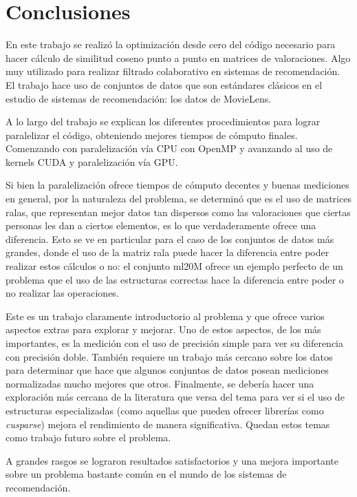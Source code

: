\documentclass[11pt, a4paper]{article}
\begin{document}
  \section{Conclusiones}\label{sec:conclusiones}

  En este trabajo se realizó la optimización desde cero del código necesario
  para hacer cálculo de similitud coseno punto a punto en matrices de
  valoraciones. Algo muy utilizado para realizar filtrado colaborativo en
  sistemas de recomendación.  El trabajo hace uso de conjuntos de datos que son
  estándares clásicos en el estudio de sistemas de recomendación: los datos de
  MovieLens.

  A lo largo del trabajo se explican los diferentes procedimientos para lograr
  paralelizar el código, obteniendo mejores tiempos de cómputo finales.
  Comenzando con paralelización vía CPU con OpenMP y avanzando al uso de
  kernels CUDA y paralelización vía GPU.

  Si bien la paralelización ofrece tiempos de cómputo decentes y buenas
  mediciones en general, por la naturaleza del problema, se determinó que es el
  uso de matrices ralas, que representan mejor datos tan dispersos como las
  valoraciones que ciertas personas les dan a ciertos elementos, es lo que
  verdaderamente ofrece una diferencia. Esto se ve en particular para el caso
  de los conjuntos de datos más grandes, donde el uso de la matriz rala puede
  hacer la diferencia entre poder realizar estos cálculos o no: el conjunto
  ml20M ofrece un ejemplo perfecto de un problema que el uso de las estructuras
  correctas hace la diferencia entre poder o no realizar las operaciones.

  Este es un trabajo claramente introductorio al problema y que ofrece varios
  aspectos extras para explorar y mejorar. Uno de estos aspectos, de los más
  importantes, es la medición con el uso de precisión simple para ver su
  diferencia con precisión doble. También requiere un trabajo más cercano sobre
  los datos para determinar que hace que algunos conjuntos de datos posean
  mediciones normalizadas mucho mejores que otros. Finalmente, se debería hacer
  una exploración más cercana de la literatura que versa del tema para ver si
  el uso de estructuras especializadas (como aquellas que pueden ofrecer
  librerías como {\em cusparse}) mejora el rendimiento de manera significativa.
  Quedan estos temas como trabajo futuro sobre el problema.

  A grandes rasgos se lograron resultados satisfactorios y una mejora
  importante sobre un problema bastante común en el mundo de los sistemas de
  recomendación.

  
  
\end{document}
